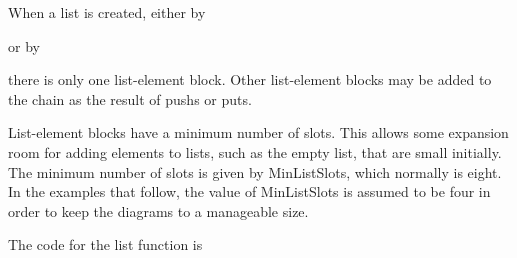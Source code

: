 When a list is created, either by


\noindent or by

\iconline{
\>[x1 ,x2, ..., xn]
}

\noindent there is only one list-element block. Other list-element
blocks may be added to the chain as the result of pushs or puts.

List-element blocks have a minimum number of slots. This allows some
expansion room for adding elements to lists, such as the empty list,
that are small initially. The minimum number of slots is given by
MinListSlots, which normally is eight. In the examples that follow,
the value of MinListSlots is assumed to be four in order to keep the
diagrams to a manageable size.

The code for the list function is

